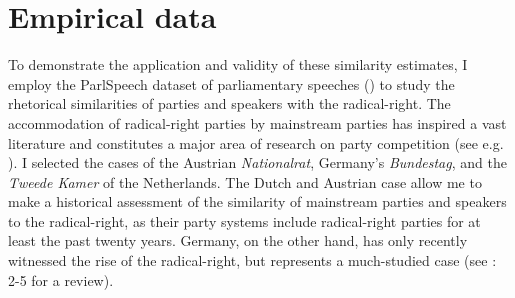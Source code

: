 \documentclass{article}
\begin{document}
\section{Empirical data}
To demonstrate the application and validity of these similarity estimates, I employ the ParlSpeech dataset of parliamentary speeches (\cite{Rauh2020}) to study the rhetorical similarities of parties and speakers with the radical-right. The accommodation of radical-right parties by mainstream parties has inspired a vast literature and constitutes a major area of research on party competition (see e.g. \cite{Arzheimer2009, Bale2010e, Dahlstrom2012a, Harmel1997a, Krause2019accomodation, Meguid2005, Schumacher2014a, Spoon2020a, VanDerBrug2005b, VanSpanje2010, Wagner2017}). I selected the cases of the Austrian \textit{Nationalrat}, Germany's \textit{Bundestag}, and the \textit{Tweede Kamer} of the Netherlands. The Dutch and Austrian case allow me to make a historical assessment of the similarity of mainstream parties and speakers to the radical-right, as their party systems include radical-right parties for at least the past twenty years. Germany, on the other hand, has only recently witnessed the rise of the radical-right, but represents a much-studied case (see \cite{Arzheimer2019}: 2-5 for a review).\par
\end{document}
